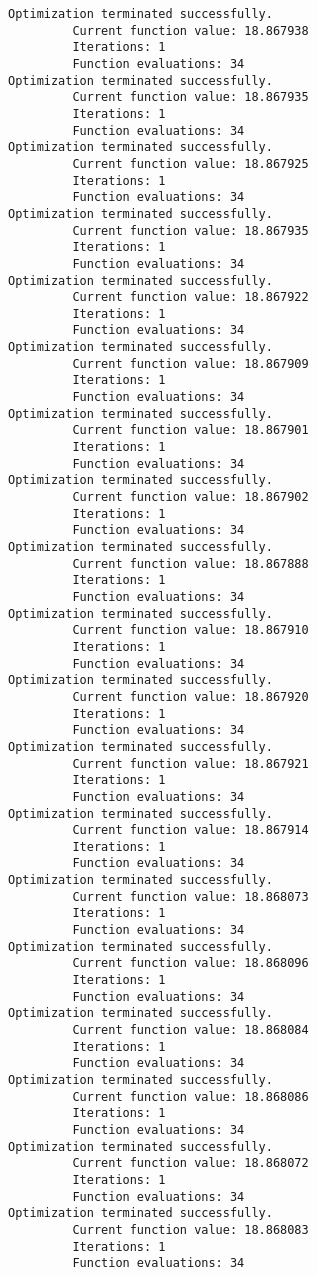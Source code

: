 \documentclass[11pt]{article}
\begin{document}
\begin{Verbatim}[commandchars=\\\{\}]
Optimization terminated successfully.
         Current function value: 18.867938
         Iterations: 1
         Function evaluations: 34
Optimization terminated successfully.
         Current function value: 18.867935
         Iterations: 1
         Function evaluations: 34
Optimization terminated successfully.
         Current function value: 18.867925
         Iterations: 1
         Function evaluations: 34
Optimization terminated successfully.
         Current function value: 18.867935
         Iterations: 1
         Function evaluations: 34
Optimization terminated successfully.
         Current function value: 18.867922
         Iterations: 1
         Function evaluations: 34
Optimization terminated successfully.
         Current function value: 18.867909
         Iterations: 1
         Function evaluations: 34
Optimization terminated successfully.
         Current function value: 18.867901
         Iterations: 1
         Function evaluations: 34
Optimization terminated successfully.
         Current function value: 18.867902
         Iterations: 1
         Function evaluations: 34
Optimization terminated successfully.
         Current function value: 18.867888
         Iterations: 1
         Function evaluations: 34
Optimization terminated successfully.
         Current function value: 18.867910
         Iterations: 1
         Function evaluations: 34
Optimization terminated successfully.
         Current function value: 18.867920
         Iterations: 1
         Function evaluations: 34
Optimization terminated successfully.
         Current function value: 18.867921
         Iterations: 1
         Function evaluations: 34
Optimization terminated successfully.
         Current function value: 18.867914
         Iterations: 1
         Function evaluations: 34
Optimization terminated successfully.
         Current function value: 18.868073
         Iterations: 1
         Function evaluations: 34
Optimization terminated successfully.
         Current function value: 18.868096
         Iterations: 1
         Function evaluations: 34
Optimization terminated successfully.
         Current function value: 18.868084
         Iterations: 1
         Function evaluations: 34
Optimization terminated successfully.
         Current function value: 18.868086
         Iterations: 1
         Function evaluations: 34
Optimization terminated successfully.
         Current function value: 18.868072
         Iterations: 1
         Function evaluations: 34
Optimization terminated successfully.
         Current function value: 18.868083
         Iterations: 1
         Function evaluations: 34

\end{Verbatim}
\end{document}
